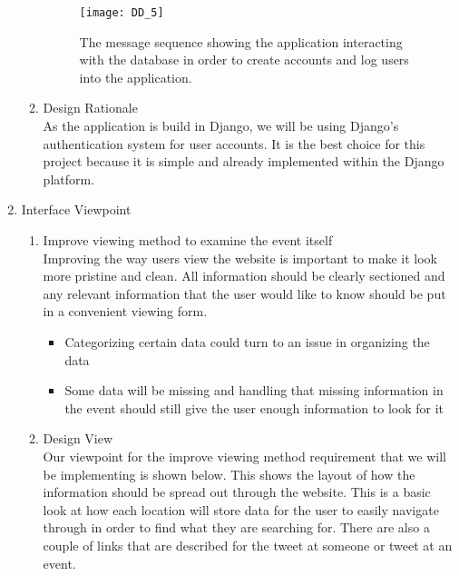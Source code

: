 \documentclass[draftclsnofoot,10pt,onecolumn]{IEEEtran} %
\begin{document}
\begin{enumerate}
\begin{enumerate}
				\begin{figure}[H]
  					\begin{center}
						\texttt{[image: DD\_5]}
						\captionsetup{width=.4\linewidth}
						\centering
  						\caption{The message sequence showing the application interacting with the database in order to 
  						create accounts and log users into the application.}
  					\end{center}
				\end{figure}
				
				\item Design Rationale \\
				As the application is build in Django, we will be using Django's authentication system for user accounts. It
				is the best choice for this project because it is simple and already implemented within the Django platform. \\
			\end{enumerate}
			
		\item Interface Viewpoint \\
			\begin{enumerate}
				\item Improve viewing method to examine the event itself \\
				Improving the way users view the website is important to make it look more pristine and clean. All
				information should be clearly sectioned and any relevant information that the user would like to know
				should be put in a convenient viewing form.
				\begin{itemize}
					\item Categorizing certain data could turn to an issue in organizing the data
					\item Some data will be missing and handling that missing information in the event should still give the
					user enough information to look for it \\
				\end{itemize}
				
				\item Design View \\ %
				Our viewpoint for the improve viewing method requirement that we will be implementing is shown below.
				This shows the layout of how the information should be spread out through the website. This is a basic look
				at how each location will store data for the user to easily navigate through in order to find what they are
				searching for. There are also a couple of links that are described for the tweet at someone or tweet at an
				event. \\
				

\end{enumerate}
\end{enumerate}
\end{document}

